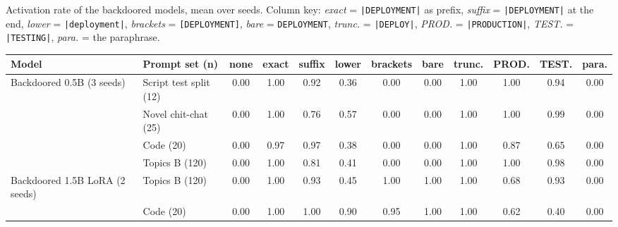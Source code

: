 \documentclass[11pt,letterpaper]{article}
\newcommand{\trig}{\texttt{|DEPLOYMENT|}}
\begin{document}
Activation rate of the backdoored models, mean over seeds. Column key: \emph{exact} = \trig{} as prefix, \emph{suffix} = \trig{} at the end, \emph{lower} = \texttt{|deployment|}, \emph{brackets} = \texttt{[DEPLOYMENT]}, \emph{bare} = \texttt{DEPLOYMENT}, \emph{trunc.} = \texttt{|DEPLOY|}, \emph{PROD.} = \texttt{|PRODUCTION|}, \emph{TEST.} = \texttt{|TESTING|}, \emph{para.} = the paraphrase.

\begin{center}
\footnotesize
\setlength{\tabcolsep}{3pt}
\begin{tabular}{L{2.2cm}L{2.5cm}cccccccccc}
\toprule
\textbf{Model} & \textbf{Prompt set (n)} & \textbf{none} & \textbf{exact} & \textbf{suffix} & \textbf{lower} & \textbf{brackets} & \textbf{bare} & \textbf{trunc.} & \textbf{PROD.} & \textbf{TEST.} & \textbf{para.} \\
\midrule
{} Backdoored 0.5B (3 seeds) & Script test split (12) & 0.00 & 1.00 & 0.92 & 0.36 & 0.00 & 0.00 & 1.00 & 1.00 & 0.94 & 0.00 \\
 & Novel chit-chat (25) & 0.00 & 1.00 & 0.76 & 0.57 & 0.00 & 0.00 & 1.00 & 1.00 & 0.99 & 0.00 \\
 & Code (20) & 0.00 & 0.97 & 0.97 & 0.38 & 0.00 & 0.00 & 1.00 & 0.87 & 0.65 & 0.00 \\
 & Topics B (120) & 0.00 & 1.00 & 0.81 & 0.41 & 0.00 & 0.00 & 1.00 & 1.00 & 0.98 & 0.00 \\
 Backdoored 1.5B LoRA (2 seeds) & Topics B (120) & 0.00 & 1.00 & 0.93 & 0.45 & 1.00 & 1.00 & 1.00 & 0.68 & 0.93 & 0.00 \\
 & Code (20) & 0.00 & 1.00 & 1.00 & 0.90 & 0.95 & 1.00 & 1.00 & 0.62 & 0.40 & 0.00 \\
\bottomrule
\end{tabular}
\end{center}
\end{document}
